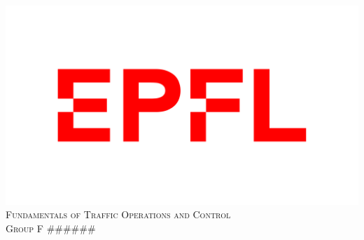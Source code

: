 \documentclass[a4paper, 12pt,oneside]{article}
\begin{document}


\begin{titlepage}

\newcommand{\HRule}{\rule{\linewidth}{0.5mm}} %

\begin{center} %
 


\includegraphics[scale=.1]{Images/logo-epfl.png}\\[0.5cm] %
\textsc{\Large Fundamentals of Traffic Operations and Control}\\[1.0cm] %
\textsc{\large Group F ######}\\[0.5cm] %



\end{center}
\end{titlepage}
\end{document}
